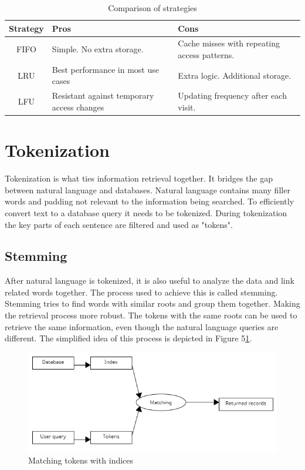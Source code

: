 \documentclass[10pt,twoside,a4paper]{article}
\begin{document}
\begin{table}[h]
    \centering
    \begin{tabular}{|c|p{4cm}|p{4cm}|}
        \hline
        Strategy & Pros & Cons \\
        \hline
        FIFO & Simple. No extra storage. & Cache misses with repeating access patterns.\\
        \hline
        LRU & Best performance in most use cases & Extra logic. Additional storage.\\
        \hline
        LFU & Resistant against temporary access changes & Updating frequency after each visit.\\
        \hline
    \end{tabular}
    \caption{Comparison of strategies}
    \label{tab:cache-strategy-comparison}
\end{table}

\section{Tokenization}
Tokenization is what ties information retrieval together. It bridges the gap between natural language and databases. 
Natural language contains many filler words and padding not relevant to the information being searched. To efficiently convert text to a database query it needs to be tokenized. During tokenization the key parts of each sentence are filtered and used as "tokens". \cite{Effective-Tokenization}
\subsection{Stemming}
After natural language is tokenized, it is also useful to analyze the data and link related words together. The process used to achieve this is called stemming. Stemming tries to find words with similar roots and group them together. Making the retrieval process more robust. The tokens with the same roots can be used to retrieve the same information, even though the natural language queries are different. The simplified idea of this process is depicted in Figure 5\ref{fig:matching-query}.

\begin{figure}[h]
    \centering
    \includegraphics[width=1\linewidth]{Matching-query.png}
    \caption{Matching tokens with indices}
    \label{fig:matching-query}
\end{figure}
\end{document}

